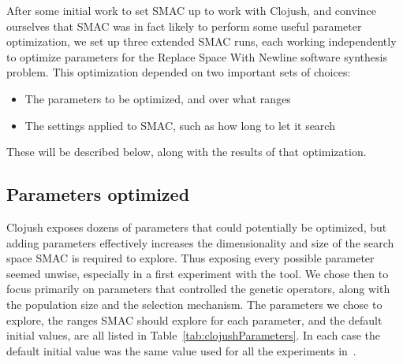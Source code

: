 After some initial work to set SMAC up to work with Clojush, and convince
ourselves that SMAC was in fact likely to perform some useful parameter
optimization, we set up three extended SMAC runs, each working independently
to optimize parameters for the Replace Space With Newline software synthesis 
problem.
This optimization depended on two important sets of choices:
\begin{itemize}
	\item The parameters to be optimized, and over what ranges
	\item The settings applied to SMAC, such as how long to let it search
\end{itemize}
These will be described below, along with the results of that optimization.

\subsection{Parameters optimized}
\label{sec:parametersOptimized}

Clojush exposes dozens of parameters that could potentially be optimized, but
adding parameters effectively increases the dimensionality and size of the
search space SMAC is required to explore. Thus exposing every possible parameter
seemed unwise, especially in a first experiment with the tool. We chose then
to focus primarily on parameters that controlled the genetic operators, along
with the population size and the selection mechanism. The parameters we chose 
to explore, the ranges SMAC should explore for each parameter, and the 
default initial values, are all listed in Table~\ref{tab:clojushParameters}.
In each case the default initial value was the same value used for all the
experiments in~\cite{Helmuth:2015:GECCO}.

